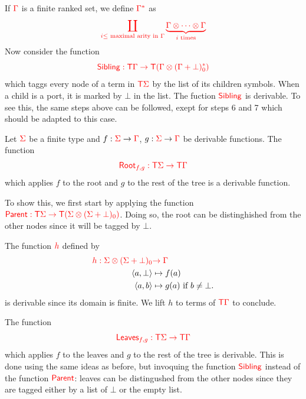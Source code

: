 \begin{example}
\medskip
If ${\color{red}{\Gamma}}$ is a finite ranked set, we define ${\color{red}{\Gamma^*}}$ as
$${\color{red}{\coprod_{i \leq \text{ maximal arity in } {\color{red}{\Gamma}}} \underbrace{{\color{red}{\Gamma}}\otimes \cdots \otimes {\color{red}{\Gamma}}}_{i\text{ times}}}}$$
Now consider the function $${\color{red}{\mathsf{Sibling}:{\color{red}{\mathsf T}}{\color{red}{\Gamma}}\to {\color{red}{\mathsf T}}({\color{red}{\Gamma}}\otimes ({\color{red}{\Gamma}}+\bot)^*_0)}}$$ which taggs every node of a term in ${\color{red}{\mathsf T}} {\color{red}{\Sigma}}$ by the list  of its children symbols. When a child is a port, it is marked by $\bot$ in the list.
The fuction ${\color{red}{\mathsf{Sibling}}}$ is derivable. To see this, the same steps above can be followed, exept for steps 6 and 7 which should be adapted to this case. 
\end{example}



\medskip
\noindent  \begin{example} Let ${\color{red}{\Sigma}}$ be a finite type and $f:{\color{red}{\Sigma}} \to {\color{red}{\Gamma}}$, $g: {\color{red}{\Sigma}} \to {\color{red}{\Gamma}}$ be derivable functions. The function $${\color{red}{\mathsf{Root}_{f,g} : {\color{red}{\mathsf T}}{\color{red}{\Sigma}}\to {\color{red}{\mathsf T}}{\color{red}{\Gamma}}}}$$
which applies $f$ to the root and $g$ to the rest of the tree is a derivable function.
 
To show this, we first start by applying the function ${\color{red}{\mathsf{Parent}:{\color{red}{\mathsf T}}{\color{red}{\Sigma}}\to{\color{red}{\mathsf T}}({\color{red}{\Sigma}}\otimes({\color{red}{\Sigma}}+\bot)_0)}}$. Doing so, the root can be distinghished from the other nodes since it will be tagged by $\bot$.  

The function ${\color{red}{h}}$ defined by 
\begin{align*}
{\color{red}{h:{\color{red}{\Sigma}}\otimes({\color{red}{\Sigma}}+\bot)_0}}&{\color{red}{\to {\color{red}{\Gamma}}}}\\
  \langle{a,\bot}\rangle &\mapsto f(a) \\
  \langle{a,b}\rangle &\mapsto g(a) \text{ if } b\neq \bot.
\end{align*}
is derivable since its domain is finite. 
We lift $h$ to terms of ${\color{red}{\mathsf T}}{\color{red}{\Gamma}}$ to conclude.



\medskip
The function $${\color{red}{\mathsf{Leaves}_{f,g} : {\color{red}{\mathsf T}}{\color{red}{\Sigma}}\to {\color{red}{\mathsf T}}{\color{red}{\Gamma}}}}$$
 which applies $f$ to the leaves and $g$ to the rest of the tree is derivable. This is done using the same ideas as before, but invoquing the function ${\color{red}{\mathsf{Sibling}}}$ instead of the function ${\color{red}{\mathsf{Parent}}}$: leaves can be distingushed from the other nodes since they are tagged either by a list of $\bot$ or the empty list.
\end{example}

